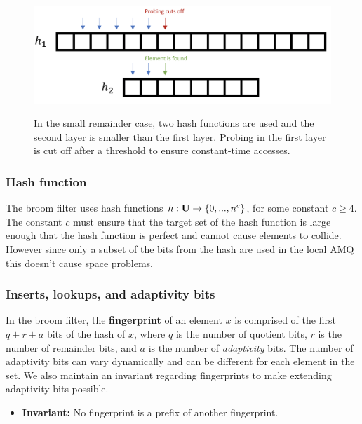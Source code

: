 \documentclass[../paper.tex]{subfiles}
\begin{document}
\begin{figure}[H]
  \centering
    \includegraphics[scale=0.3]{probe.png}
  \label{fig:probe}
    \caption{In the small remainder case, two hash functions are used and the second layer is smaller than the first layer. Probing in the first layer is cut off after a threshold to ensure constant-time accesses.}  
\end{figure}

\subsubsection{Hash function}

The broom filter uses hash functions $h : {\bf U} \rightarrow \{0, ..., n^c\}$, for
some constant $c \geq 4$. The constant $c$ must ensure that the target set of the hash
function is large enough that the hash function is perfect and cannot cause elements
to collide. However since only a subset of the bits from the hash are used in the local
AMQ this doesn't cause space problems.


\subsubsection{Inserts, lookups, and adaptivity bits}

In the broom filter, the \textbf{fingerprint} of an element $x$ is comprised of the first
$q + r + a$ bits of the hash of $x$, where $q$ is the number of quotient bits, $r$ is the
number of remainder bits, and $a$ is the number of \textit{adaptivity} bits. The number of
adaptivity bits can vary dynamically and can be different for each element in the set. We
also maintain an invariant regarding fingerprints to make extending adaptivity bits possible.

\begin{itemize}
    \item[] \textbf{Invariant:} No fingerprint is a prefix of another fingerprint.
\end{itemize}
\end{document}
